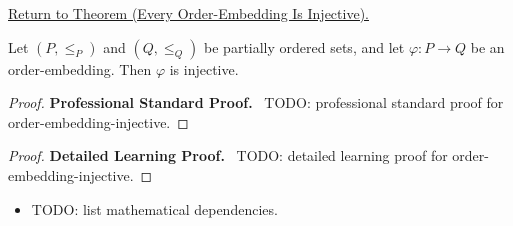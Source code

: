 \newpage
{}
\label{prf:order-embedding-injective}

\begin{remark*}[Return]
\hyperref[lem:order-embedding-injective]{Return to Theorem (Every Order-Embedding Is Injective).}
\end{remark*}

\begin{theorem*}
Let $(P, \leq_P)$ and $(Q, \leq_Q)$ be partially ordered sets, and let
$\varphi : P \to Q$ be an order-embedding.  Then $\varphi$ is injective.
\end{theorem*}

\begin{proof}
\textbf{Professional Standard Proof.}~
TODO: professional standard proof for order-embedding-injective.
\end{proof}

\begin{proof}
\textbf{Detailed Learning Proof.}~
TODO: detailed learning proof for order-embedding-injective.
\end{proof}

\begin{remark*}
\end{remark*}

\begin{dependencies}
\begin{itemize}
  \item TODO: list mathematical dependencies.
\end{itemize}
\end{dependencies}

\clearpage
